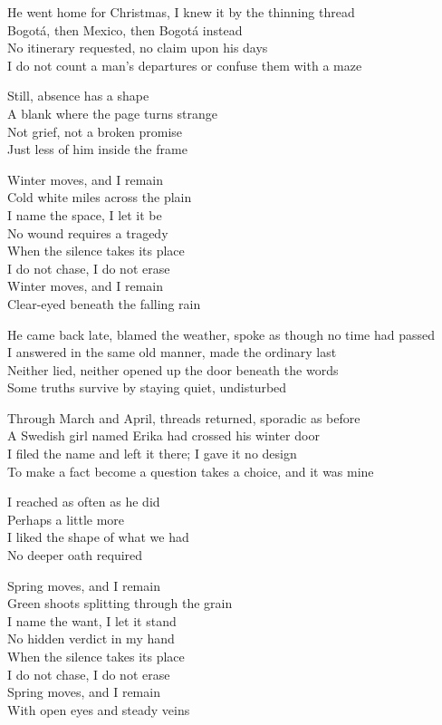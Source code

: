 \begin{lyrics}

He went home for Christmas, I knew it by the thinning thread\\
Bogotá, then Mexico, then Bogotá instead\\
No itinerary requested, no claim upon his days\\
I do not count a man's departures or confuse them with a maze

Still, absence has a shape\\
A blank where the page turns strange\\
Not grief, not a broken promise\\
Just less of him inside the frame

Winter moves, and I remain\\
Cold white miles across the plain\\
I name the space, I let it be\\
No wound requires a tragedy\\
When the silence takes its place\\
I do not chase, I do not erase\\
Winter moves, and I remain\\
Clear-eyed beneath the falling rain

He came back late, blamed the weather, spoke as though no time had passed\\
I answered in the same old manner, made the ordinary last\\
Neither lied, neither opened up the door beneath the words\\
Some truths survive by staying quiet, undisturbed

Through March and April, threads returned, sporadic as before\\
A Swedish girl named Erika had crossed his winter door\\
I filed the name and left it there; I gave it no design\\
To make a fact become a question takes a choice, and it was mine

I reached as often as he did\\
Perhaps a little more\\
I liked the shape of what we had\\
No deeper oath required

Spring moves, and I remain\\
Green shoots splitting through the grain\\
I name the want, I let it stand\\
No hidden verdict in my hand\\
When the silence takes its place\\
I do not chase, I do not erase\\
Spring moves, and I remain\\
With open eyes and steady veins


\end{lyrics}
